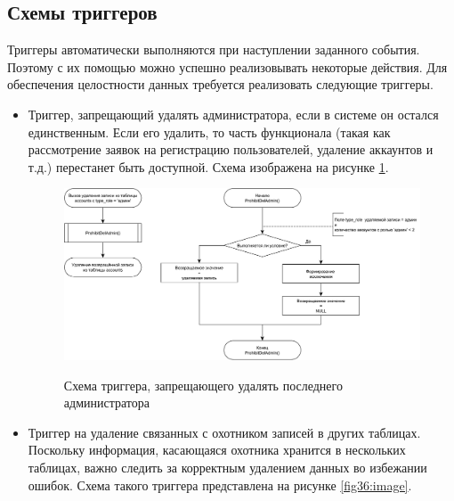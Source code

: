 	\subsection{Схемы триггеров}
	Триггеры автоматически выполняются при наступлении заданного события. Поэтому с их помощью можно успешно реализовывать некоторые действия. Для обеспечения целостности данных требуется реализовать следующие триггеры.
	\begin{itemize}
		\item Триггер, запрещающий удалять администратора, если в системе он остался единственным. Если его удалить, то часть функционала (такая как рассмотрение заявок на регистрацию пользователей, удаление аккаунтов и т.д.) перестанет быть доступной. Схема изображена на рисунке \ref{fig35:image}.
		
		\begin{figure}[h]
			\centering
			\begin{center}
				{\includegraphics[scale=0.45]{schemes/triggeradmin.pdf}}
				\caption{Схема триггера, запрещающего удалять последнего администратора}
				\label{fig35:image}
			\end{center}
		\end{figure}
	
		\item Триггер на удаление связанных с охотником записей в других таблицах. Поскольку информация, касающаяся охотника хранится в нескольких таблицах, важно следить за корректным удалением данных во избежании ошибок. Схема такого триггера представлена на рисунке \ref{fig36:image}.
		

\end{itemize}
